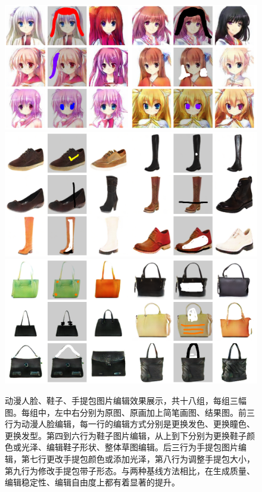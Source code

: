 \documentclass[a4paper,12pt,UTF8]{ctexart}
\newcommand{\kai}{\CJKfamily{zhkai}}	%
\begin{document}
\begin{figure}[H]
  \centering
  \includegraphics[width=0.9\linewidth]{figs/pic.png}
  \includegraphics[width=0.9\linewidth]{figs/shoes.png}
  \includegraphics[width=0.9\linewidth]{figs/handbags.png}
  \caption{\kai 动漫人脸、鞋子、手提包图片编辑效果展示，共十八组，每组三幅图。每组中，左中右分别为原图、原画加上简笔画图、结果图。前三行为动漫人脸编辑，每一行的编辑方式分别是更换发色、更换瞳色、更换发型。第四到六行为鞋子图片编辑，从上到下分别为更换鞋子颜色或光泽、编辑鞋子形状、整体草图编辑。后三行为手提包图片编辑，第七行更改手提包颜色或添加光泽，第八行为调整手提包大小，第九行为修改手提包带子形态。与两种基线方法相比，在生成质量、编辑稳定性、编辑自由度上都有着显著的提升。}
  \label{fig:pic}
\end{figure}

\end{document}

